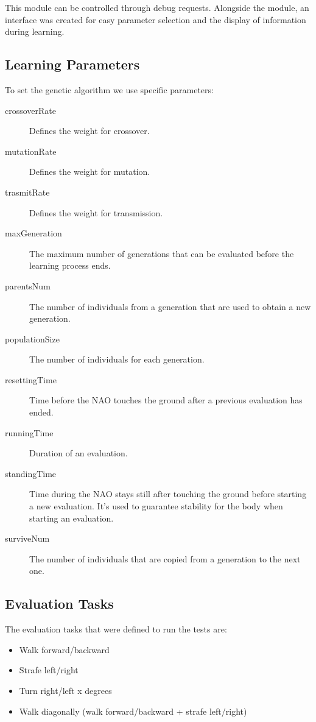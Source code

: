 \documentclass{article}
\begin{document}
This module can be controlled through debug requests. Alongside the module, an interface was created for easy parameter selection and the display of information during learning.

\subsection{Learning Parameters}

To set the genetic algorithm we use specific parameters:

\begin{description}
\item[crossoverRate] Defines the weight for crossover.
\item[mutationRate] Defines the weight for mutation.
\item[trasmitRate] Defines the weight for transmission.
\item[maxGeneration] The maximum number of generations that can be evaluated before the learning process ends. 

\item[parentsNum] The number of individuals from a generation that are used to obtain a new generation.
\item[populationSize] The number of individuals for each generation.
\item[resettingTime] Time before the NAO touches the ground after a previous evaluation has ended.
\item[runningTime] Duration of an evaluation.
\item[standingTime] Time during the NAO stays still after touching the ground before starting a new evaluation. It's used to guarantee stability for the body when starting an evaluation.
\item[surviveNum] The number of individuals that are copied from a generation to the next one. 

\end{description}

\subsection{Evaluation Tasks}

The evaluation tasks that were defined to run the tests are:

\begin{itemize}
\item Walk forward/backward 
\item Strafe left/right 
\item Turn right/left x degrees 
\item Walk diagonally (walk forward/backward + strafe left/right) 

\end{itemize}
\end{document}
